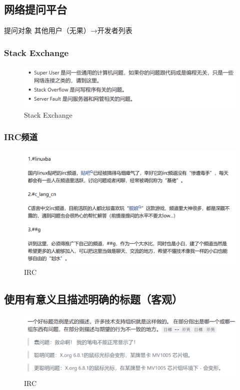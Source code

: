 \documentclass{article}
\begin{document}
\newpage

\subsection{网络提问平台}

提问对象   其他用户（无果）→开发者列表

\subsubsection{Stack Exchange}
\begin{figure}[h]
    \centering
    \includegraphics[width=18cm]{image3.png}
    \caption{Stack Exchange}
    \label{fig:enter-label}
\end{figure}

\subsubsection{IRC频道}
\begin{figure}[h]
    \centering
    \includegraphics[width=18cm]{image6.png}
    \caption{IRC}
    \label{fig:enter-label}
\end{figure}
\newpage

\subsection{使用有意义且描述明确的标题（客观）}
\begin{figure}[h]
    \centering
    \includegraphics[width=18cm]{image4.png}
    \caption{IRC}
    \label{fig:enter-label}
\end{figure}
\end{document}
